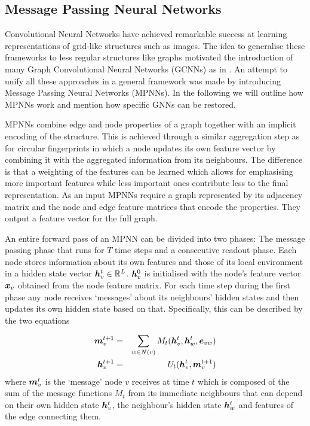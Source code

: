\subsection{Message Passing Neural Networks}
\label{sec:MPNN}

Convolutional Neural Networks \citep{lecun1999object} have achieved remarkable success at learning representations of grid-like structures such as images. The idea to generalise these frameworks to less regular structures like graphs motivated the introduction of many Graph Convolutional Neural Networks (GCNNs) as in \citep{li2015gated,duvenaud2015convolutional,Kearnes_2016, Sch_tt_2017}. An attempt to unify all these approaches in a general framework was made by \cite{GilmerSRVD17} introducing Message Passing Neural Networks (MPNNs). In the following we will outline how MPNNs work and mention how specific GNNs can be restored. 

MPNNs combine edge and node properties of a graph together with an implicit encoding of the structure. This is achieved through a similar aggregation step as for circular fingerprints in which a node updates its own feature vector by combining it with the aggregated information from its neighbours. The difference is that a weighting of the features can be learned which allows for emphasising more important features while less important ones contribute less to the final representation. As an input MPNNs require a graph represented by its adjacency matrix and the node and edge feature matrices that encode the properties. They output a feature vector for the full graph. 

An entire forward pass of an MPNN can be divided into two phases: The message passing phase that runs for $T$ time steps and a consecutive readout phase. Each node stores information about its own features and those of its local environment in a hidden state vector ${\boldsymbol h}_v^t \in {\mathbb{R}}^L$.  $\boldsymbol h_v^0$ is initialised with the node's feature vector $\boldsymbol x_v$ obtained from the node feature matrix. For each time step during the first phase any node receives `messages' about its neighbours' hidden states and then updates its own hidden state based on that. Specifically, this can be described by the two equations

\begin{eqnarray}
\boldsymbol m_v^{t+1} & =& \sum_{w\in N(v)} M_t(\boldsymbol h_v^t, \boldsymbol h_w^t, \boldsymbol e_{vw}) \label{eq:message_passing} \\
\boldsymbol h_v^{t+1} & =& U_t(\boldsymbol h_v^t, \boldsymbol m_v^{t+1})\label{eq:updating}
\end{eqnarray}
where $\boldsymbol m_v^t$ is the `message' node $v$ receives at time $t$ which is composed of the sum of the message functions $M_t$ from its immediate neighbours that can depend on their own hidden state $\boldsymbol h_v^t$, the neighbour's hidden state $\boldsymbol h_w^t$ and features of the edge connecting them.

